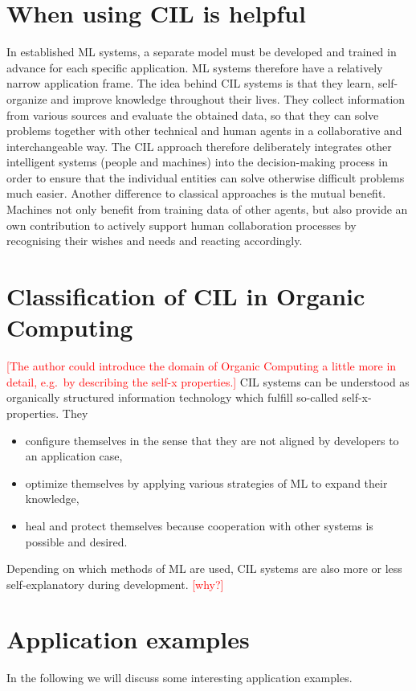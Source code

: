\documentclass[conference]{IEEEtran}
\newcommand\notes[1]{\textcolor{red}{#1}}
\begin{document}
\section{When using CIL is helpful}\label{AdvantageOfCIL}
In established ML systems, a separate model must be developed and trained in advance for 
each specific application. ML systems therefore have a relatively narrow application frame. 
The idea behind CIL systems is that they learn, self-organize and improve knowledge throughout their lives. 
They collect information from various sources and evaluate the obtained data, so that they 
can solve problems together with other technical and human agents in a 
collaborative and interchangeable way\cite{CIL:sick}.
The CIL approach therefore deliberately integrates other intelligent systems 
(people and machines) into the decision-making process in order to ensure that the individual entities 
can solve otherwise difficult problems much easier.
Another difference to classical approaches is the mutual benefit. 
Machines not only benefit from training data of other agents, but also provide 
an own contribution to actively support human collaboration processes by 
recognising their wishes and needs and reacting accordingly\cite{CIL:sick}.

\section{Classification of CIL in Organic Computing}
\notes{[The author could introduce the domain of Organic Computing a little more in detail, e.g.\ by describing the self-x properties.]}
CIL systems can be understood as organically structured information technology
which fulfill so-called self-x-properties\cite{Organic:schloer}\cite{Organic:schmeck}.
They
\begin{itemize}
    \item configure themselves in the sense that they are not aligned by developers to an application case,
    \item optimize themselves by applying various strategies of ML to expand their knowledge,
    \item heal and protect themselves because cooperation with other systems is possible and desired.
\end{itemize}
Depending on which methods of ML are used, CIL systems are also more or less self-explanatory 
during development\cite{Organic:schloer}.
\notes{[why?]}

\section{Application examples}
In the following we will discuss some interesting application examples.
\end{document}
